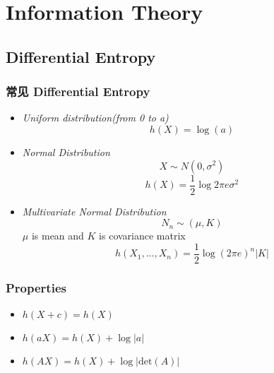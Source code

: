 \documentclass{article} 	%
\begin{document}
\newpage




\section{Information Theory}
	\subsection{Differential Entropy}
		\subsubsection{常见 Differential Entropy}
			\begin{itemize}
			       \item
            		       \emph{Uniform distribution(from 0 to a)}
                                \[
                                h(X) = \log(a)
                                \]
                                
                                \item
                                \emph{Normal Distribution}
                                \[
                                 X\sim N(0,\sigma^2)
                                 \]
                                 \[
                                 h(X) = \frac{1}{2} \log2\pi e \sigma^2 
                                \]
                                
                                \item
                                \emph{Multivariate Normal Distribution}
                                $$N_n\sim(\mu, K)$$
                                $\mu$ is mean and $K$ is covariance matrix
                                \[
                                h(X_1,\ldots,X_n) = \frac{1}{2}\log(2\pi e )^n |K|
                                \]
			\end{itemize}
			
		\subsubsection{Properties}
                        \begin{itemize}
                                \item $h(X+c) = h(X)$\\
                                \item$h(aX) = h(X) + \log|a|$\\
                                \item$h(AX) = h(X) + \log\big|\mathrm{det}(A)\big|$
                        \end{itemize}
\end{document}
